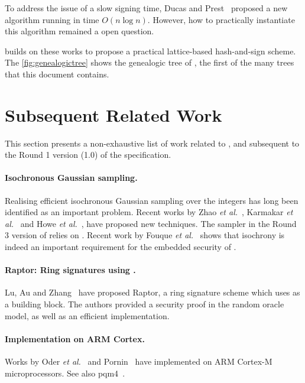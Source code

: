 To address the issue of a slow signing time, Ducas and Prest~\cite{ISSAC:DucPre16} proposed a new algorithm running in time $O(n \log n)$. However, how to practically instantiate this algorithm remained a open question.

\falcon builds on these works to propose a practical lattice-based hash-and-sign scheme. The \cref{fig:genealogictree} shows the genealogic tree of \falcon, the first of the many trees that this document contains.


\section{Subsequent Related Work}\label{sec:related}

This section presents a non-exhaustive list of work related to \falcon, and subsequent to the Round 1 version (1.0) of the specification.

\paragraph{Isochronous Gaussian sampling.} Realising efficient isochronous Gaussian sampling over the integers has long been identified as an important problem. Recent works by Zhao \textit{et al.}~\cite{TC:ZhaSteSak20}, Karmakar \textit{et al.}~\cite{DAC:KSVV19} and Howe \textit{et al.}~\cite{PQCRYPTO:HPRR20}, have proposed new techniques. The sampler in the Round 3 version of \falcon relies on \cite{TC:ZhaSteSak20,PQCRYPTO:HPRR20}. Recent work by Fouque \textit{et al.}~\cite{EC:FKTWY20} shows that isochrony is indeed an important requirement for the embedded security of \falcon.

\paragraph{Raptor: Ring signatures using \falcon.}  Lu, Au and Zhang~\cite{EPRINT:LuAuZha18} have proposed Raptor, a ring signature scheme which uses \falcon as a building block. The authors provided a security proof in the random oracle model, as well as an efficient implementation.

\paragraph{Implementation on ARM Cortex.} Works by Oder \textit{et al.}~\cite{PQCRYPTO:OSHG19} and Pornin~\cite{EPRINT:Pornin19} have implemented \falcon on ARM Cortex-M microprocessors. See also pqm4~\cite{EPRINT:KRSS19}.

